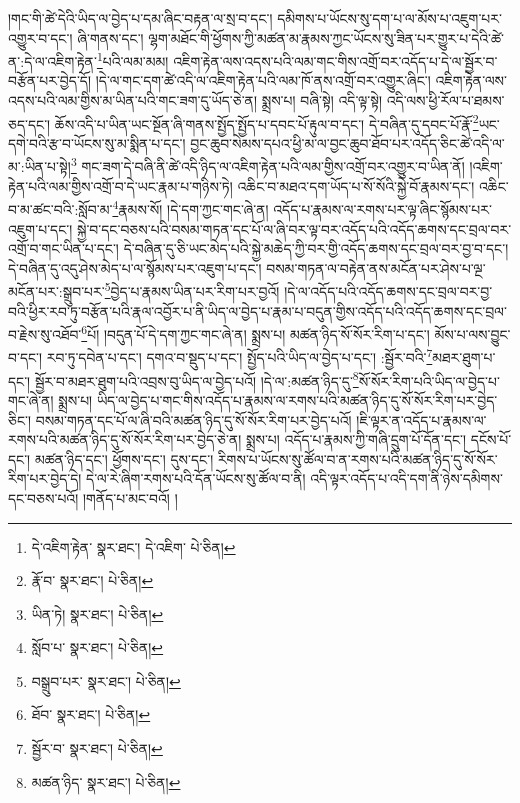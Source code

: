 །གང་གི་ཚེ་དེའི་ཡིད་ལ་བྱེད་པ་དམ་ཞིང་བརྟན་ལ་སྲ་བ་དང་། དམིགས་པ་ཡོངས་སུ་དག་པ་ལ་མོས་པ་འཇུག་པར་འགྱུར་བ་དང་། ཞི་གནས་དང་། ལྷག་མཐོང་གི་ཕྱོགས་ཀྱི་མཚན་མ་རྣམས་ཀྱང་ཡོངས་སུ་ཟིན་པར་གྱུར་པ་དེའི་ཚེ་ན་:དེ་ལ་འཇིག་རྟེན་\footnote{དེ་འཇིག་རྟེན་  སྣར་ཐང་། དེ་འཇིག་  པེ་ཅིན། }པའི་ལམ་མམ། འཇིག་རྟེན་ལས་འདས་པའི་ལམ་གང་གིས་འགྲོ་བར་འདོད་པ་དེ་ལ་སྦྱོར་བ་བརྩོན་པར་བྱེད་དོ། །དེ་ལ་གང་དག་ཚེ་འདི་ལ་འཇིག་རྟེན་པའི་ལམ་ཁོ་ནས་འགྲོ་བར་འགྱུར་ཞིང་། འཇིག་རྟེན་ལས་འདས་པའི་ལམ་གྱིས་མ་ཡིན་པའི་གང་ཟག་དུ་ཡོད་ཅེ་ན། སྨྲས་པ། བཞི་སྟེ། འདི་ལྟ་སྟེ། འདི་ལས་ཕྱི་རོལ་པ་ཐམས་ཅད་དང་། ཆོས་འདི་པ་ཡིན་ཡང་སྔོན་ཞི་གནས་སྤྱོད་སྤྱོད་པ་དབང་པོ་རྟུལ་བ་དང་། དེ་བཞིན་དུ་དབང་པོ་རྣོ་\footnote{རྣོ་བ་  སྣར་ཐང་།  པེ་ཅིན། }ཡང་དགེ་བའི་རྩ་བ་ཡོངས་སུ་མ་སྨིན་པ་དང་། བྱང་ཆུབ་སེམས་དཔའ་ཕྱི་མ་ལ་བྱང་ཆུབ་ཐོབ་པར་འདོད་ཅིང་ཚེ་འདི་ལ་མ་:ཡིན་པ་སྟེ།\footnote{ཡིན་ཏེ།  སྣར་ཐང་།  པེ་ཅིན། } གང་ཟག་དེ་བཞི་ནི་ཚེ་འདི་ཉིད་ལ་འཇིག་རྟེན་པའི་ལམ་གྱིས་འགྲོ་བར་འགྱུར་བ་ཡིན་ནོ། །འཇིག་རྟེན་པའི་ལམ་གྱིས་འགྲོ་བ་དེ་ཡང་རྣམ་པ་གཉིས་ཏེ། འཆིང་བ་མཐའ་དག་ཡོད་པ་སོ་སོའི་སྐྱེ་བོ་རྣམས་དང་། འཆིང་བ་མ་ཚང་བའི་:སློབ་མ་\footnote{སློབ་པ་  སྣར་ཐང་།  པེ་ཅིན། }རྣམས་སོ། །དེ་དག་ཀྱང་གང་ཞེ་ན། འདོད་པ་རྣམས་ལ་རགས་པར་ལྟ་ཞིང་སྙོམས་པར་འཇུག་པ་དང་། སྐྱེ་བ་དང་བཅས་པའི་བསམ་གཏན་དང་པོ་ལ་ཞི་བར་ལྟ་བར་འདོད་པའི་འདོད་ཆགས་དང་བྲལ་བར་འགྲོ་བ་གང་ཡིན་པ་དང་། དེ་བཞིན་དུ་ཅི་ཡང་མེད་པའི་སྐྱེ་མཆེད་ཀྱི་བར་གྱི་འདོད་ཆགས་དང་བྲལ་བར་བྱ་བ་དང་། དེ་བཞིན་དུ་འདུ་ཤེས་མེད་པ་ལ་སྙོམས་པར་འཇུག་པ་དང་། བསམ་གཏན་ལ་བརྟེན་ནས་མངོན་པར་ཤེས་པ་ལྔ་མངོན་པར་:སྒྲུབ་པར་\footnote{བསྒྲུབ་པར་  སྣར་ཐང་།  པེ་ཅིན། }བྱེད་པ་རྣམས་ཡིན་པར་རིག་པར་བྱའོ། །དེ་ལ་འདོད་པའི་འདོད་ཆགས་དང་བྲལ་བར་བྱ་བའི་ཕྱིར་རབ་ཏུ་བརྩོན་པའི་རྣལ་འབྱོར་པ་ནི་ཡིད་ལ་བྱེད་པ་རྣམ་པ་བདུན་གྱིས་འདོད་པའི་འདོད་ཆགས་དང་བྲལ་བ་རྗེས་སུ་འཐོབ་\footnote{ཐོབ་  སྣར་ཐང་།  པེ་ཅིན། }པོ། །བདུན་པོ་དེ་དག་ཀྱང་གང་ཞེ་ན། སྨྲས་པ། མཚན་ཉིད་སོ་སོར་རིག་པ་དང་། མོས་པ་ལས་བྱུང་བ་དང་། རབ་ཏུ་དབེན་པ་དང་། དགའ་བ་སྡུད་པ་དང་། སྤྱོད་པའི་ཡིད་ལ་བྱེད་པ་དང་། :སྦྱོར་བའི་\footnote{སྦྱོར་བ་  སྣར་ཐང་།  པེ་ཅིན། }མཐར་ཐུག་པ་དང་། སྦྱོར་བ་མཐར་ཐུག་པའི་འབྲས་བུ་ཡིད་ལ་བྱེད་པའོ། །དེ་ལ་:མཚན་ཉིད་དུ་\footnote{མཚན་ཉིད་  སྣར་ཐང་།  པེ་ཅིན། }སོ་སོར་རིག་པའི་ཡིད་ལ་བྱེད་པ་གང་ཞེ་ན། སྨྲས་པ། ཡིད་ལ་བྱེད་པ་གང་གིས་འདོད་པ་རྣམས་ལ་རགས་པའི་མཚན་ཉིད་དུ་སོ་སོར་རིག་པར་བྱེད་ཅིང་། བསམ་གཏན་དང་པོ་ལ་ཞི་བའི་མཚན་ཉིད་དུ་སོ་སོར་རིག་པར་བྱེད་པའོ། །ཇི་ལྟར་ན་འདོད་པ་རྣམས་ལ་རགས་པའི་མཚན་ཉིད་དུ་སོ་སོར་རིག་པར་བྱེད་ཅེ་ན། སྨྲས་པ། འདོད་པ་རྣམས་ཀྱི་གཞི་དྲུག་པོ་དོན་དང་། དངོས་པོ་དང་། མཚན་ཉིད་དང་། ཕྱོགས་དང་། དུས་དང་། རིགས་པ་ཡོངས་སུ་ཚོལ་བ་ན་རགས་པའི་མཚན་ཉིད་དུ་སོ་སོར་རིག་པར་བྱེད་དེ། དེ་ལ་རེ་ཞིག་རགས་པའི་དོན་ཡོངས་སུ་ཚོལ་བ་ནི། འདི་ལྟར་འདོད་པ་འདི་དག་ནི་ཉེས་དམིགས་དང་བཅས་པའོ། །གནོད་པ་མང་བའོ། །
